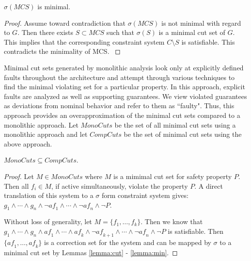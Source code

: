 \begin{lemma} $\sigma(MCS)$ is minimal.
\begin{proof}
Assume toward contradiction that $\sigma(MCS)$ is not minimal with regard to $G$. Then there exists $S \subset MCS$ such that $\sigma(S)$ is a minimal cut set of $G$. This implies that the corresponding constraint system $C \setminus S$ is satisfiable. This contradicts the minimality of MCS.
\label{lemma:min}
\end{proof}
\end{lemma}

Minimal cut sets generated by monolithic analysis look only at explicitly defined faults throughout the architecture and attempt through various techniques to find the minimal violating set for a particular property. In this approach, explicit faults are analyzed as well as supporting guarantees. We view violated guarantees as deviations from nominal behavior and refer to them as ``faulty". Thus, this approach provides an overapproximation of the minimal cut sets compared to a monolithic approach. Let $\mathit{MonoCuts}$ be the set of all minimal cut sets using a monolithic approach and let $\mathit{CompCuts}$ be the set of minimal cut sets using the above approach. 

\begin{theorem} $\mathit{MonoCuts} \subseteq \mathit{CompCuts}$.
\begin{proof}
Let $M \in \mathit{MonoCuts}$ where $M$ is a mimimal cut set for safety property $P$. Then all $f_i \in M$, if active simultaneously, violate the property $P$. A direct translation of this system to a $\sigma$ form constraint system gives: $g_1  \land \cdots \land g_n  \land \neg \mathit{af}_{1} \land \cdots \land \neg \mathit{af}_{n} \land \neg P$. 

Without loss of generality, let $M = \{f_1, \dots, f_k\}$. Then we know that $g_1  \land \cdots \land g_n  \land \mathit{af}_1 \land \cdots \land \mathit{af}_k \land \neg \mathit{af}_{k+1} \land \cdots \land \neg \mathit{af}_{n} \land \neg P$ is satisfiable. Then $\{\mathit{af}_1, \dots,\mathit{af}_k\}$ is a correction set for the system and can be mapped by $\sigma$ to a minimal cut set by Lemmas \ref{lemma:cut} - \ref{lemma:min}.
\end{proof}
\end{theorem}





